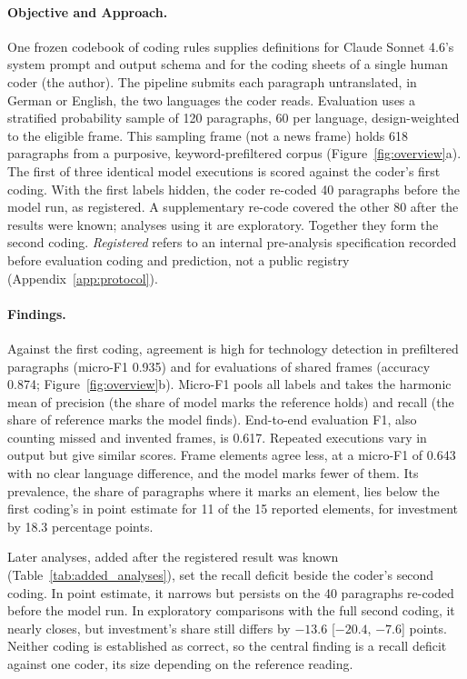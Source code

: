 \paragraph{Objective and Approach.}
One frozen codebook of coding rules supplies definitions for Claude Sonnet 4.6's system prompt and output schema and for the coding sheets of a single human coder (the author). The pipeline submits each paragraph untranslated, in German or English, the two languages the coder reads. Evaluation uses a stratified probability sample of 120 paragraphs, 60 per language, design-weighted to the eligible frame. This sampling frame (not a news frame) holds 618 paragraphs from a purposive, keyword-prefiltered corpus (Figure~\ref{fig:overview}a). The first of three identical model executions is scored against the coder's first coding. With the first labels hidden, the coder re-coded 40 paragraphs before the model run, as registered. A supplementary re-code covered the other 80 after the results were known; analyses using it are exploratory. Together they form the second coding. \emph{Registered} refers to an internal pre-analysis specification recorded before evaluation coding and prediction, not a public registry (Appendix~\ref{app:protocol}).



\paragraph{Findings.}
Against the first coding, agreement is high for technology detection in prefiltered paragraphs (micro-F1 0.935) and for evaluations of shared frames (accuracy 0.874; Figure~\ref{fig:overview}b). Micro-F1 pools all labels and takes the harmonic mean of precision (the share of model marks the reference holds) and recall (the share of reference marks the model finds). End-to-end evaluation F1, also counting missed and invented frames, is 0.617. Repeated executions vary in output but give similar scores. Frame elements agree less, at a micro-F1 of 0.643 with no clear language difference, and the model marks fewer of them. Its prevalence, the share of paragraphs where it marks an element, lies below the first coding's in point estimate for 11 of the 15 reported elements, for investment by 18.3 percentage points.

Later analyses, added after the registered result was known (Table~\ref{tab:added_analyses}), set the recall deficit beside the coder's second coding. In point estimate, it narrows but persists on the 40 paragraphs re-coded before the model run. In exploratory comparisons with the full second coding, it nearly closes, but investment's share still differs by $-13.6$ [$-20.4$, $-7.6$] points. Neither coding is established as correct, so the central finding is a recall deficit against one coder, its size depending on the reference reading.

